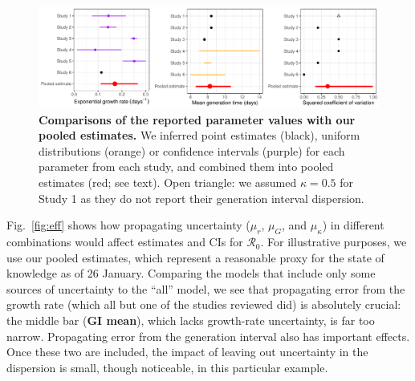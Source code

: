 \documentclass[12pt]{article}
\newcommand{\fref}[1]{Fig.~\ref{fig:#1}}
\newcommand{\Rx}[1]{\ensuremath{{\mathcal R}_{#1}}}
\newcommand{\Ro}{\Rx{0}\xspace}
\begin{document}
\begin{figure}[t]
\includegraphics[width=\textwidth]{compare_assumption.pdf}
\caption{
\textbf{Comparisons of the reported parameter values with our pooled estimates.}
We inferred point estimates (black), uniform distributions (orange) or confidence intervals (purple) for each parameter from each study, and combined them into pooled estimates (red; see text).
Open triangle: we assumed $\kappa=0.5$ for Study 1 as they do not report their generation interval dispersion.
}
\label{fig:assumption}
\end{figure}

\fref{eff} shows how propagating uncertainty ($\mu_r$, $\mu_G$, and $\mu_\kappa$) in different combinations would affect estimates and CIs for \Ro. For illustrative purposes, we use our pooled estimates, which represent a reasonable proxy for the state of knowledge as of 26 January. 
Comparing the models that include only some sources of uncertainty to the ``all'' model, we see that propagating error from the growth rate (which all but one of the studies reviewed did) is absolutely crucial: the middle bar (\textbf{GI mean}), which lacks growth-rate uncertainty, is far too narrow.
Propagating error from the generation interval also has important effects.
Once these two are included, the impact of leaving out uncertainty in the dispersion is small, though noticeable, in this particular example.
\end{document}
